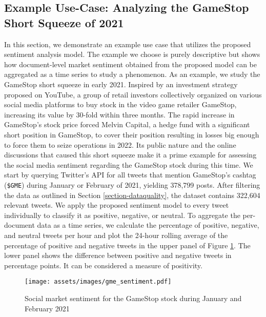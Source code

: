 

\subsection{Example Use-Case: Analyzing the GameStop Short Squeeze of 2021}
In this section, we demonstrate an example use case that utilizes the proposed sentiment analysis model. The example we choose is purely descriptive but shows how document-level market sentiment obtained from the proposed model can be aggregated as a time series to study a phenomenon.
As an example, we study the GameStop short squeeze in early 2021. Inspired by an investment strategy proposed on YouTube, a group of retail investors collectively organized on various social media platforms to buy stock in the video game retailer GameStop, increasing its value by 30-fold within three months. The rapid increase in GameStop's stock price forced Melvin Capital, a hedge fund with a significant short position in GameStop, to cover their position resulting in losses big enough to force them to seize operations in 2022. Its public nature and the online discussions that caused this short squeeze make it a prime example for assessing the social media sentiment regarding the GameStop stock during this time.\newline
We start by querying Twitter's API for all tweets that mention GameStop's cashtag (\texttt{\$GME}) during January or February of 2021, yielding 378,799 posts. After filtering the data as outlined in Section \ref{section-dataquality}, the dataset contains 322,604 relevant tweets. We apply the proposed sentiment model to every tweet individually to classify it as positive, negative, or neutral. To aggregate the per-document data as a time series, we calculate the percentage of positive, negative, and neutral tweets per hour and plot the 24-hour rolling average of the percentage of positive and negative tweets in the upper panel of Figure \ref{figure-gme-sentiment}. The lower panel shows the difference between positive and negative tweets in percentage points. It can be considered a measure of positivity.

\begin{figure}[!ht]
	\texttt{[image: assets/images/gme\_sentiment.pdf]}
	\caption{Social market sentiment for the GameStop stock during January and February 2021}
	\label{figure-gme-sentiment}
\end{figure}

